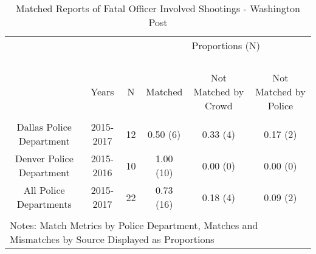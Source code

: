 
\begin{table}[!htbp] \centering 
  \caption{Matched Reports of Fatal Officer Involved Shootings - Washington Post} 
  \label{} 
\footnotesize 
\begin{tabular}{@{\extracolsep{5pt}} cccccc} 
\\[-1.8ex]\hline 
 &&& \multicolumn{3}{c}{Proportions (N)} \\ \cline{4-6} \\[-4.8ex]  \\
\hline \\[-1.8ex] 
\hline \\[-1.8ex] 
 & Years & N & Matched & Not Matched by Crowd & Not Matched by Police \\ 
\hline \\[-1.8ex] 
Dallas Police Department & 2015-2017 & 12 & 0.50 (6) & 0.33 (4) & 0.17 (2) \\ 
Denver Police Department & 2015-2016 & 10 & 1.00 (10) & 0.00 (0) & 0.00 (0) \\ 
All Police Departments   & 2015-2017 & 22 & 0.73 (16) & 0.18 (4) & 0.09 (2) \\ 
\hline \\[-1.8ex] 
\multicolumn{6}{l}{Notes: Match Metrics by Police Department, Matches and Mismatches by Source Displayed as Proportions} \\ 
\end{tabular} 
\end{table}  
